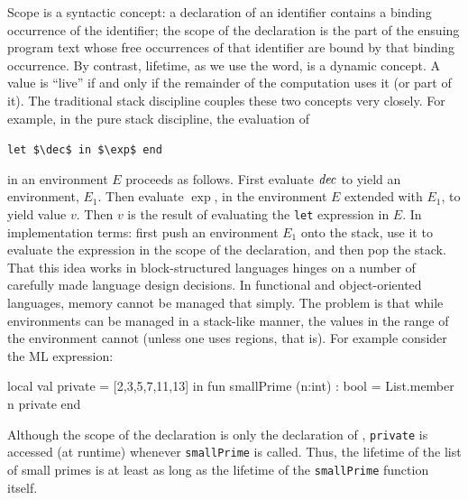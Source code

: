 \documentclass[12pt]{book}
\begin{document}
Scope
%
%
is a syntactic concept: a declaration of an identifier contains a binding
occurrence of the identifier; the scope of the declaration is the part of the
ensuing program text whose free occurrences of that identifier are bound by that
binding occurrence. By contrast, lifetime, as we use the word, is a dynamic
concept. A value is ``live'' if and only if the remainder of the computation
uses it (or part of it). The traditional
%
%
stack discipline couples these two concepts very closely. For example,
in the pure stack discipline, the evaluation of
\begin{center}
  \lstinline!let $\dec$ in $\exp$ end!
\end{center}
in an environment $E$ proceeds as follows. First evaluate ${\it dec}$ to yield an
environment, $E_1$. Then evaluate $\exp$, in the environment $E$ extended with
$E_1$, to yield value $v$. Then $v$ is the result of evaluating the
\lstinline{let} expression in $E$. In implementation terms: first push an
environment $E_1$ onto the stack, use it to evaluate the expression in the scope
of the declaration, and then pop the stack. That this idea works in
%
%
block-structured languages hinges on a number of carefully made language design
decisions. In functional and object-oriented languages, memory cannot be managed
that simply. The problem is that while environments can be managed in a
stack-like manner, the values in the range of the environment cannot (unless one
uses regions, that is). For example consider the ML expression:
\begin{smlcode}
  local
     val private = [2,3,5,7,11,13]
  in
     fun smallPrime (n:int) : bool = List.member n private
  end
\end{smlcode}

Although the scope of the declaration is only the declaration of
%
%
, \lstinline{private} is accessed (at runtime) whenever
\lstinline{smallPrime} is called.  Thus, the lifetime of the list of small
primes is at least as long as the lifetime of the \lstinline{smallPrime}
function itself.
\end{document}
